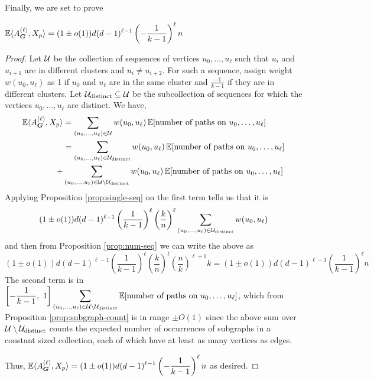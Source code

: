 Finally, we are set to prove
\begin{proposition}
	$\displaystyle
		\operatorname*{\mathbb{E}}\langle A_{\boldsymbol{G}}^{(\ell)}, X_p\rangle = (1\pm o(1))d(d-1)^{\ell-1}\left(-\frac{1}{k-1}\right)^{\ell}n
	$
\end{proposition}
\begin{proof}
	Let $\mathcal{U}$ be the collection of sequences of vertices $u_0,\dots,u_\ell$ such that $u_i$ and $u_{i+1}$ are in different clusters and $u_i\ne u_{i+2}$.  For such a sequence, assign weight $w(u_0,u_\ell)$ as 1 if $u_0$ and $u_\ell$ are in the same cluster and $\frac{-1}{k-1}$ if they are in different clusters.  Let $\mathcal{U}_{\mathrm{distinct}}\subseteq \mathcal{U}$ be the subcollection of sequences for which the vertices $u_0,\dots,u_\ell$ are distinct.  We have,
	\begin{align*}
		\operatorname*{\mathbb{E}}\langle A_{\boldsymbol{G}}^{(\ell)}, X_p\rangle &= \sum_{(u_0,\dots,u_\ell)\in\mathcal{U}} w(u_0,u_\ell) \operatorname*{\mathbb{E}}[\text{number of paths on $u_0,\dots,u_\ell$}]\\
		&= \sum_{(u_0,\dots,u_\ell)\in\mathcal{U}_{\mathrm{distinct}}} w(u_0,u_\ell) \operatorname*{\mathbb{E}}[\text{number of paths on $u_0,\dots,u_\ell$}] \\ +
		&\sum_{(u_0,\dots,u_\ell)\in\mathcal{U}\setminus\mathcal{U}_{\mathrm{distinct}}} w(u_0,u_\ell) \operatorname*{\mathbb{E}}[\text{number of paths on $u_0,\dots,u_\ell$}]
	\end{align*}
	Applying Proposition \ref{prop:single-seq} on the first term tells us that it is
	\[
		(1\pm o(1))d(d-1)^{\ell-1}\left(\frac{1}{k-1}\right)^{\ell}\left(\frac{k}{n}\right)^{\ell}\sum_{(u_0,\dots,u_\ell)\in\mathcal{U}_{\mathrm{distinct}}} w(u_0,u_\ell)
	\]
	and then from Proposition \ref{prop:num-seq} we can write the above as
	\[
		(1\pm o(1))d(d-1)^{\ell-1}\left(\frac{1}{k-1}\right)^{\ell}\left(\frac{k}{n}\right)^{\ell}\left(\frac{n}{k}\right)^{\ell+1}k = (1\pm o(1))d(d-1)^{\ell-1}\left(\frac{1}{k-1}\right)^{\ell}n
	\]
	The second term is in $\displaystyle \left[-\frac{1}{k-1},~1\right] \sum_{(u_0,\dots,u_\ell)\in\mathcal{U}\setminus\mathcal{U}_{\mathrm{distinct}}} \operatorname*{\mathbb{E}}[\text{number of paths on $u_0,\dots,u_\ell$}]$,
	which from Proposition \ref{prop:subgraph-count} is in range $\pm O(1)$ since the above sum over $\mathcal{U}\setminus\mathcal{U}_{\mathrm{distinct}}$ counts the expected number of occurrences of subgraphs in a constant sized collection, each of which have at least as many vertices as edges.

	Thus, $\displaystyle \operatorname*{\mathbb{E}}\langle A_{\boldsymbol{G}}^{(\ell)}, X_p\rangle = (1\pm o(1))d(d-1)^{\ell-1}\left(-\frac{1}{k-1}\right)^{\ell}n$ as desired.

\end{proof}

